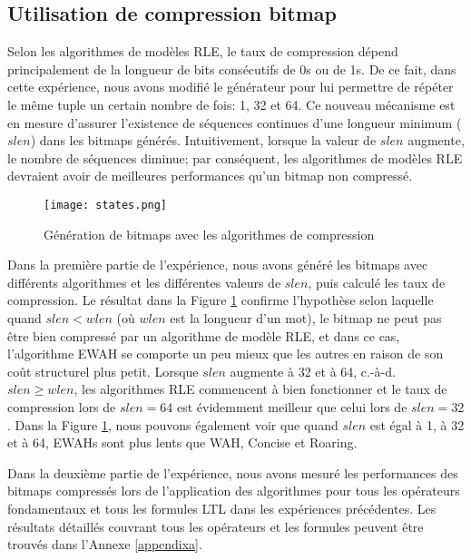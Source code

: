 
\subsection{Utilisation de compression bitmap} %

Selon les algorithmes de modèles RLE, le taux de compression dépend principalement de la longueur de bits consécutifs de 0s ou de 1s. De ce fait, dans cette expérience, nous avons modifié le générateur pour lui permettre de répéter le même tuple un certain nombre de fois: 1, 32 et 64. Ce nouveau mécanisme est en mesure d'assurer l'existence de séquences continues d'une longueur minimum ($slen$) dans les bitmaps générés. Intuitivement, lorsque la valeur de $slen$ augmente, le nombre de séquences diminue; par conséquent, les algorithmes de modèles RLE devraient avoir de meilleures performances qu'un bitmap non compressé.

\begin{figure}[h]
\begin{center}
\centering
\texttt{[image: states.png]}
\caption{Génération de bitmaps avec les algorithmes de compression}
\label{img:states}
\end{center}
\end{figure}

Dans la première partie de l'expérience, nous avons généré les bitmaps avec différents algorithmes et les différentes valeurs de $slen$, puis calculé les taux de compression. Le résultat dans la Figure \ref{img:states} confirme l'hypothèse selon laquelle quand $slen < wlen$ (où $wlen$ est la longueur d'un mot), le bitmap ne peut pas être bien compressé par un algorithme de modèle RLE, et dans ce cas, l'algorithme EWAH se comporte un peu mieux que les autres en raison de son coût structurel plus petit. Lorsque $slen$ augmente à 32 et à 64, c.-à-d. $slen \geq wlen$, les algorithmes RLE commencent à bien fonctionner et le taux de compression lors de $slen = 64$ est évidemment meilleur que celui lors de $slen = 32$. Dans la Figure \ref{img:states}, nous pouvons également voir que quand $slen$ est égal à 1, à 32 et à 64, EWAHs sont plus lents que WAH, Concise et Roaring.

Dans la deuxième partie de l'expérience, nous avons mesuré les performances des bitmaps compressés lors de l'application des algorithmes pour tous les opérateurs fondamentaux et tous les formules LTL dans les expériences précédentes. Les résultats détaillés couvrant tous les opérateurs et les formules peuvent être trouvés dans l'Annexe \ref{appendixa}.

